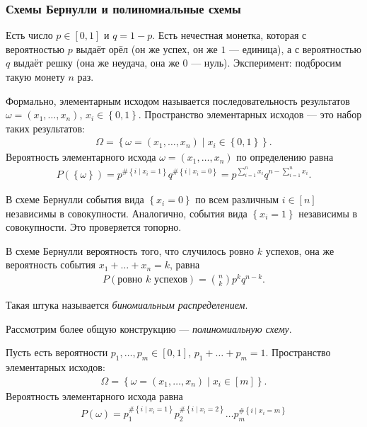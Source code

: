 \documentclass[../main.tex]{subfiles}
\begin{document}
\subsubsection*{Схемы Бернулли и полиномиальные схемы}

\begin{df*}
 Есть число $p \in [0,1]$ и $q = 1 - p$. Есть нечестная монетка, которая с вероятностью $p$ выдаёт орёл (он же успех, он же $1$ --- единица), а с вероятностью $q$ выдаёт решку (она же неудача, она же $0$ --- нуль). Эксперимент: подбросим такую монету $n$ раз.

 Формально, элементарным исходом называется последовательность результатов $\omega = (x_1, \ldots, x_n)$, $x_i \in \left\{ 0,1 \right\}$. Пространство элементарных исходов --- это набор таких результатов:
 \begin{align*}
  \Omega = \left\{ \omega = (x_1, \ldots, x_n) \mid x_i \in \left\{ 0,1 \right\} \right\}.
 \end{align*} Вероятность элементарного исхода $\omega = (x_1, \ldots, x_n)$ по определению равна
 \begin{align*}
  P(\left\{ \omega \right\}) = p^{\# \left\{ i \mid x_i = 1 \right\}} q^{\# \left\{ i \mid x_i = 0 \right\}} = p^{\sum_{i=1}^{n} x_i} q^{n - \sum_{i=1}^{n} x_i}
 .\end{align*} 
\end{df*}

\begin{prop*}
 В схеме Бернулли события вида $\left\{ x_i = 0 \right\}$ по всем различным $i \in [n]$ независимы в совокупности. Аналогично, события вида $\left\{ x_i = 1 \right\}$  независимы в совокупности. Это проверяется топорно.
\end{prop*}

\begin{prop*}
 В схеме Бернулли вероятность того, что случилось ровно $k$ успехов, она же вероятность события $x_1 + \ldots + x_n = k$, равна
 \begin{align*}
  P(\text{ровно $k$ успехов}) = \binom n k p^{k} q^{n-k}
 .\end{align*} 
\end{prop*}
Такая штука называется \textit{биномиальным распределением}.

Рассмотрим более общую конструкцию --- \textit{полиномиальную схему}.
\begin{df*}
 Пусть есть вероятности $p_1, \ldots, p_m \in [0,1]$, $p_1 + \ldots + p_m = 1$. Пространство элементарных исходов:
 \begin{align*}
  \Omega = \left\{ \omega = (x_1, \ldots, x_n) \mid x_i \in [m] \right\}.
 \end{align*} Вероятность элементарного исхода равна
 \begin{align*}
  P(\omega) = p_1^{\# \left\{ i \mid x_i = 1 \right\}} p_2^{\# \left\{ i \mid x_i = 2 \right\}} \ldots p_m^{\# \left\{ i \mid x_i = m \right\}}
 \end{align*} 
\end{df*}
\end{document}

